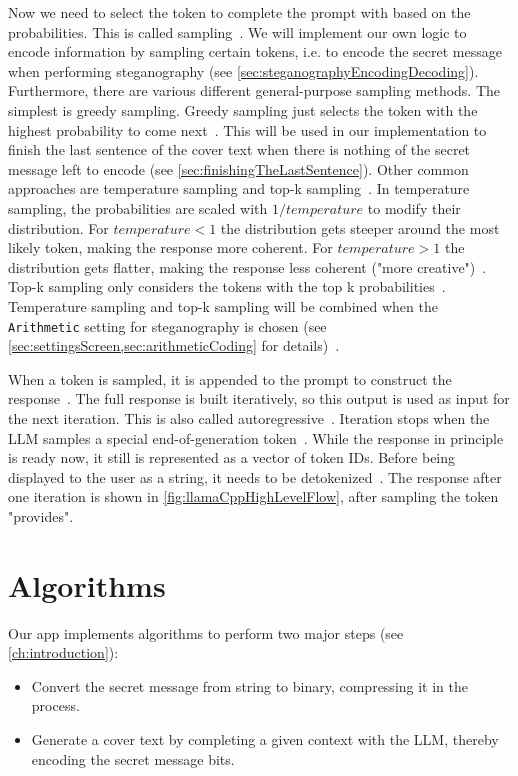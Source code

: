 Now we need to select the token to complete the prompt with based on the probabilities. This is called sampling~\cite{mallisUnderstandingHowLLM2023}. We will implement our own logic to encode information by sampling certain tokens, i.e. to encode the secret message when performing steganography (see \cref{sec:steganographyEncodingDecoding}). Furthermore, there are various different general-purpose sampling methods. The simplest is greedy sampling. Greedy sampling just selects the token with the highest probability to come next~\cite{mallisUnderstandingHowLLM2023}. This will be used in our implementation to finish the last sentence of the cover text when there is nothing of the secret message left to encode (see \cref{sec:finishingTheLastSentence}). Other common approaches are temperature sampling and top-k sampling~\cite{mallisUnderstandingHowLLM2023}. In temperature sampling, the probabilities are scaled with $1/temperature$ to modify their distribution. For $temperature < 1$ the distribution gets steeper around the most likely token, making the response more coherent. For $temperature > 1$ the distribution gets flatter, making the response less coherent ("more creative")~\cite{mallisUnderstandingHowLLM2023}. Top-k sampling only considers the tokens with the top k probabilities~\cite{mallisUnderstandingHowLLM2023}. Temperature sampling and top-k sampling will be combined when the \lstinline|Arithmetic| setting for steganography is chosen (see \cref{sec:settingsScreen,sec:arithmeticCoding} for details)~\cite{zieglerHarvardnlpNeuralSteganography2025}.

When a token is sampled, it is appended to the prompt to construct the response~\cite{mallisUnderstandingHowLLM2023}. The full response is built iteratively, so this output is used as input for the next iteration. This is also called autoregressive~\cite{mallisUnderstandingHowLLM2023}. Iteration stops when the \gls{LLM} samples a special end-of-generation token~\cite{gerganovGgerganovLlamacpp2024}. While the response in principle is ready now, it still is represented as a vector of token IDs. Before being displayed to the user as a string, it needs to be detokenized~\cite{mallisUnderstandingHowLLM2023}. The response after one iteration is shown in \cref{fig:llamaCppHighLevelFlow}, after sampling the token "provides".

\section{Algorithms}
\label{sec:algorithms}
Our app implements algorithms to perform two major steps (see \cref{ch:introduction}):
\begin{itemize}
    \item Convert the secret message from string to binary, compressing it in the process.
    \item Generate a cover text by completing a given context with the \gls{LLM}, thereby encoding the secret message bits.
\end{itemize}


